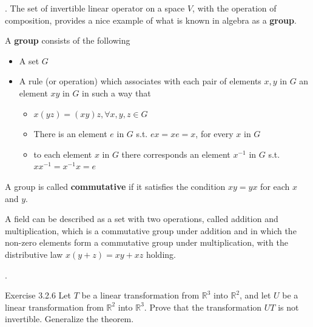 \documentclass[8pt]{beamer}
\newcommand{\mbb}[1]{\mathbb{#1}}
\newcommand{\tb}[1]{\textbf{#1}}
\begin{document}
\begin{frame}{.}
    The set of invertible linear operator on a space $V$, with the operation of composition, provides a nice example of what is known in algebra as a \tb{group}.

    \begin{definition}
        A \tb{group} consists of the following
        \begin{itemize}
            \item A set $G$
            \item A rule (or operation) which associates with each pair of elements $x, y$ in $G$ an element $xy$ in $G$ in such a way that
            \begin{itemize}
                \item $x(yz) = (xy)z, \forall x,y,z \in G$
                \item There is an element $e$ in $G$ s.t. $ex=xe=x$, for every $x$ in $G$
                \item to each element $x$ in $G$ there corresponds an element $x^{-1}$ in $G$ s.t. $x x^{-1} = x^{-1}x = e$
            \end{itemize}
        \end{itemize}

        A group is called \tb{commutative} if it satisfies the condition $xy = yx$ for each $x$ and $y$.
    \end{definition}

    A field can be described as a set with two operations, called addition and multiplication, which is a commutative group under addition and in which the non-zero elements form a commutative group under multiplication, with the distributive law $x(y+z) = xy + xz$ holding.
\end{frame}

\begin{frame}{.}
    \begin{block}{Exercise 3.2.6}
        Let $T$ be a linear transformation from $\mbb{R}^3$ into $\mbb{R}^2$, and let $U$ be a linear transformation from $\mbb{R}^2$ into $\mbb{R}^3$. Prove that the transformation $UT$ is not invertible. Generalize the theorem.
    \end{block}
\end{frame}
\end{document}
